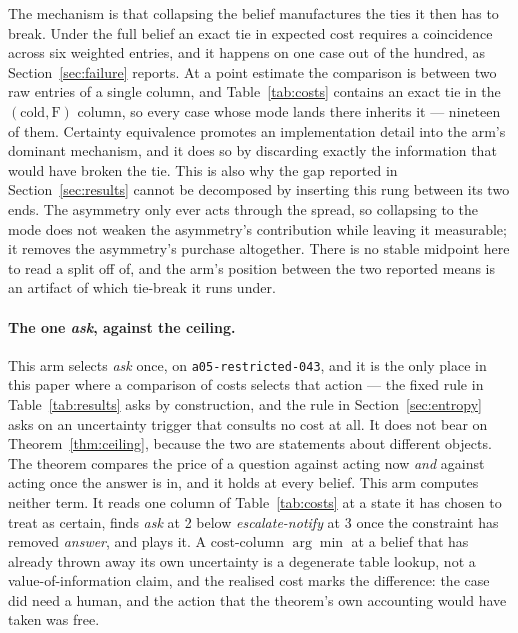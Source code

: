 \documentclass{article}
\begin{document}
The mechanism is that collapsing the belief manufactures the ties it then has to
break. Under the full belief an exact tie in expected cost requires a coincidence
across six weighted entries, and it happens on one case out of the hundred, as
Section~\ref{sec:failure} reports. At a point estimate the comparison is between two
raw entries of a single column, and Table~\ref{tab:costs} contains an exact tie in
the $(\text{cold}, \text{F})$ column, so every case whose mode lands there inherits
it --- nineteen of them. Certainty equivalence promotes an implementation detail into
the arm's dominant mechanism, and it does so by discarding exactly the information
that would have broken the tie. This is also why the gap reported in
Section~\ref{sec:results} cannot be decomposed by inserting this rung between its two
ends. The asymmetry only ever acts through the spread, so collapsing to the mode does
not weaken the asymmetry's contribution while leaving it measurable; it removes the
asymmetry's purchase altogether. There is no stable midpoint here to read a split off
of, and the arm's position between the two reported means is an artifact of which
tie-break it runs under.

\paragraph{The one \emph{ask}, against the ceiling.} This arm selects \emph{ask}
once, on \texttt{a05-restricted-043}, and it is the only place in this paper where a
comparison of costs selects that action --- the fixed rule in
Table~\ref{tab:results} asks by construction, and the rule in
Section~\ref{sec:entropy} asks on an uncertainty trigger that consults no cost at
all. It does not bear on Theorem~\ref{thm:ceiling}, because the two are
statements about different objects. The theorem compares the price of a question
against acting now \emph{and} against acting once the answer is in, and it holds at
every belief. This arm computes neither term. It reads one column of
Table~\ref{tab:costs} at a state it has chosen to treat as certain, finds
\emph{ask} at 2 below \emph{escalate-notify} at 3 once the constraint has removed
\emph{answer}, and plays it. A cost-column $\arg\min$ at a belief that has already
thrown away its own uncertainty is a degenerate table lookup, not a
value-of-information claim, and the realised cost marks the difference: the case did
need a human, and the action that the theorem's own accounting would have taken was
free.
\end{document}
